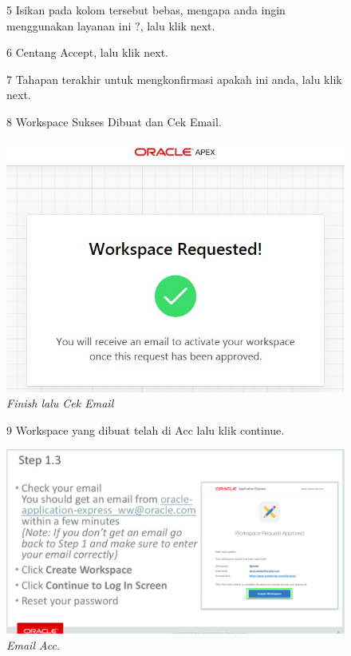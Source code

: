 \begin{enumerate}
\begin{figure}[!htbp]
      
\item[5]Isikan pada kolom tersebut bebas, mengapa anda ingin menggunakan layanan ini ?, lalu klik next.

 
\item[6] Centang Accept, lalu klik next.


\item[7] Tahapan terakhir untuk mengkonfirmasi apakah ini anda, lalu klik next.

   
\item[8] Workspace Sukses Dibuat dan Cek Email.

    \begin{center}
\includegraphics[scale=0.5]{figures/pict(3).jpg}
    \caption{\textit{Finish lalu Cek Email}}
        \end{center}
\label{gambar}
\end{figure}

\begin{figure}
\item[9] Workspace yang dibuat telah di Acc lalu klik continue.

    \begin{center}
\includegraphics[scale=0.2]{figures/step2.png}
    \caption{\textit{Email Acc.}}
        \end{center}
\label{gambar}
\end{figure}





\end{enumerate}
